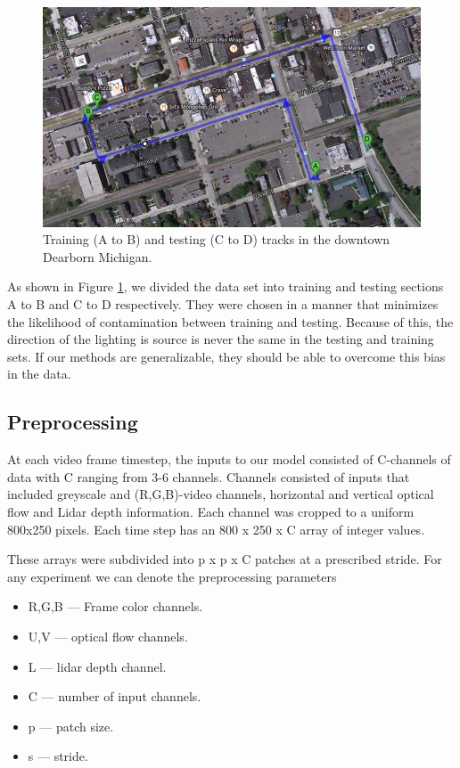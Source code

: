 \documentclass{article}
\begin{document}
\begin{figure}[htbp]
    \centering
        \includegraphics[scale=0.35]{Figures/ford_train_test_track.jpg}
    \caption{Training (A to B) and testing (C to D) tracks in the downtown Dearborn Michigan.}
    \label{fig:ford_train_test_track}
\end{figure}

As shown in Figure \ref{fig:ford_train_test_track}, we divided the data set into training and testing sections A to B and C to D respectively. They were chosen in a manner that minimizes the likelihood of contamination between training and testing. Because of this, the direction of the lighting is source is never the same in the testing and training sets. If our methods are generalizable, they should be able to overcome this bias in the data.   


\subsection{Preprocessing} %
\label{sub:preprocessing}
At each video frame timestep, the inputs to our model consisted of C-channels of data with C ranging from 3-6 channels. Channels consisted of inputs that included greyscale and (R,G,B)-video channels, horizontal and vertical optical flow and Lidar depth information. Each channel was cropped to a uniform 800x250 pixels. Each time step has an 800 x 250 x C array of integer values.

These arrays were subdivided into p x p x C patches at a prescribed stride. For any experiment we can denote the preprocessing parameters 
\begin{itemize}
\item R,G,B --- Frame color channels.
\item U,V --- optical flow channels.
\item L --- lidar depth channel.
\item C --- number of input channels.
\item p --- patch size.
\item s --- stride.
\end{itemize}  
\end{document}
